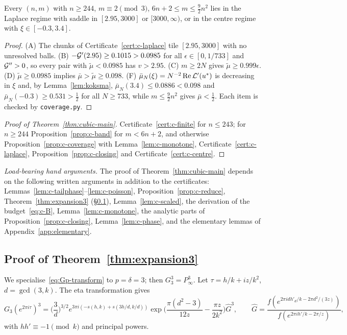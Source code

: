 \begin{proposition}\label{prop:c-coverage}
Every $(n,m)$ with $n\ge244$, $m\equiv2\pmod3$, $6n+2\le m\le\frac92n^2$ lies in the Laplace regime with saddle in
$[2.95,3000]$ or $[3000,\infty)$, or in the centre regime with $\xi\in[-0.3,3.4]$.
\end{proposition}
\begin{proof}
(A) The chunks of Certificate~\ref{cert:c-laplace} tile $[2.95,3000]$ with no unresolved balls. (B) $-\mathcal G'(2.95)\ge0.1015>0.0985$
for all $\epsilon\in[0,1/733]$ and $\mathcal G''>0$, so every pair with $\tilde\mu<0.0985$ has $v>2.95$. (C) $m\ge2N$ gives
$\tilde\mu\ge0.999\epsilon$. (D) $\tilde\mu\ge0.0985$ implies $\bar\mu>\tilde\mu\ge0.098$. (F)
$\bar\mu_N(\xi)=N^{-2}\operatorname{Re} \mathcal L'(u^*)$ is decreasing in $\xi$ and, by Lemma~\ref{lem:koksma}, $\bar\mu_N(3.4)\le0.0886<0.098$
and $\bar\mu_N(-0.3)\ge0.531>\frac12$ for all $N\ge733$, while $m\le\frac92n^2$ gives $\bar\mu<\frac12$. Each item is checked
by \texttt{coverage.py}.
\end{proof}

\begin{proof}[Proof of Theorem~\ref{thm:cubic-main}]
Certificate~\ref{cert:c-finite} for $n\le243$; for $n\ge244$ Proposition~\ref{prop:c-band} for $m<6n+2$, and otherwise
Proposition~\ref{prop:c-coverage} with Lemma~\ref{lem:c-monotone}, Certificate~\ref{cert:c-laplace},
Proposition~\ref{prop:c-closing} and Certificate~\ref{cert:c-centre}.
\end{proof}

\medskip\noindent\emph{Load-bearing hand arguments.} The proof of Theorem~\ref{thm:cubic-main} depends on the following
written arguments in addition to the certificates: Lemmas~\ref{lem:c-tailphase}--\ref{lem:c-poisson},
Proposition~\ref{prop:c-reduce}, Theorem~\ref{thm:expansion3} (\S\ref{sec:expansion3}), Lemma~\ref{lem:c-scaled}, the
derivation of the budget~\eqref{eq:c-B}, Lemma~\ref{lem:c-monotone}, the analytic parts of
Proposition~\ref{prop:c-closing}, Lemma~\ref{lem:c-phase}, and the elementary lemmas of Appendix~\ref{app:elementary}.

\subsection{Proof of Theorem~\ref{thm:expansion3}}\label{sec:expansion3}

We specialise~\eqref{eq:Gp-transform} to $p=\delta=3$; then $G_3^3=P_\infty^3$. Let $\tau=h/k+iz/k^2$, $d=\gcd(3,k)$.
The eta transformation gives
\[
G_3(e^{2\pi i\tau})^3=\Big(\frac3d\Big)^{3/2}e^{3\pi i(-s(h,k)+s(3h/d,k/d))}
\exp\Big(\frac{\pi(d^2-3)}{12z}-\frac{\pi z}{2k^2}\Big)\widehat G^3,\qquad
\widehat G=\frac{f(e^{2\pi i dh'_d/k-2\pi d^2/(3z)})}{f(e^{2\pi ih'/k-2\pi/z})},
\]
with $hh'\equiv-1\pmod k$ and principal powers.

